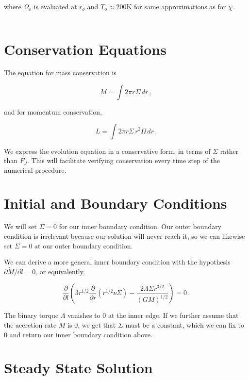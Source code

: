 \documentclass{article}
\begin{document}
where $\Omega_o$ is evaluated at $r_o$ and $T_o \approx 200$K for same approximations as for $\chi$.\\\\

\section{Conservation Equations}

The equation for mass conservation is

\begin{equation}
M = \int 2\pi r \Sigma\, dr\,,
\end{equation}

and for momentum conservation,

\begin{equation}
\textit{L} = \int2\pi r \Sigma\, r^2 \Omega\, dr\,.
\end{equation}

We express the evolution equation in a conservative form, in terms of $\Sigma$ rather than $F_J$. This will facilitate verifying conservation every time step of the numerical procedure.

\section{Initial and Boundary Conditions}

We will set $\Sigma = 0$ for our inner boundary condition. Our outer boundary condition is irrelevant because our solution will never reach it, so we can likewise set $\Sigma = 0$ at our outer boundary condition. 

We can derive a more general inner boundary condition with the hypothesis $\partial \dot{M}/ \partial l = 0$, or equivalently,

\begin{equation}
\frac{\partial}{\partial l} \left(3 r^{1/2} \frac{\partial}{\partial r} \left(r^{1/2} \nu \Sigma\right) - \frac{2 \Lambda \Sigma r^{3/2}}{(G M)^{1/2}}\right)= 0\,.
\end{equation}

The binary torque $\Lambda$ vanishes to 0 at the inner edge. If we further assume that the accretion rate $\dot{M}$ is 0, we get that $\Sigma$ must be a constant, which we can fix to 0 and return our inner boundary condition above.

\section{Steady State Solution}
\end{document}
